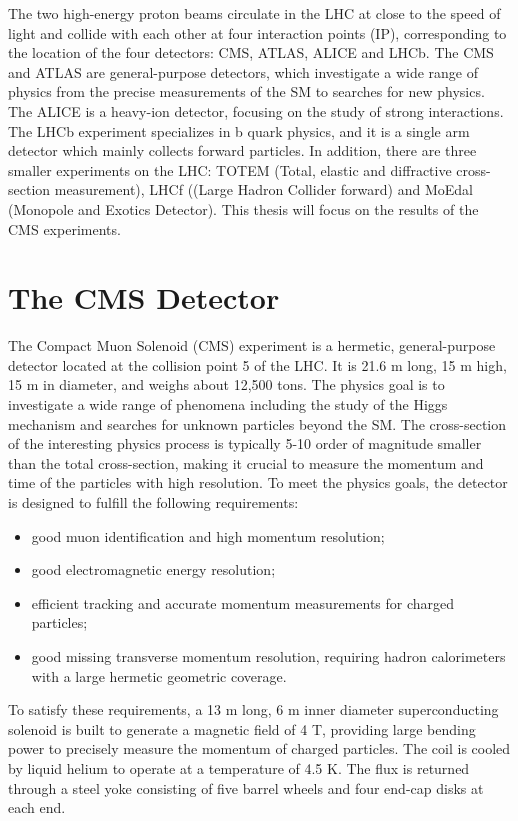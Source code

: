 \documentclass[thesis.tex]{subfiles}
\begin{document}
The two high-energy proton beams circulate in the LHC at close to the speed of light and collide with each other at four interaction points (IP), corresponding to the location of the four detectors: CMS, ATLAS, ALICE and LHCb. 
The CMS and ATLAS are general-purpose detectors, which investigate a wide range of physics from the precise measurements of the SM to searches for new physics. 
The ALICE is a heavy-ion detector, focusing on the study of strong interactions. 
The LHCb experiment specializes in b quark physics, and it is a single arm detector which mainly collects forward particles. 
In addition, there are three smaller experiments on the LHC: TOTEM (Total, elastic and diffractive cross-section measurement), LHCf ((Large Hadron Collider forward) and MoEdal (Monopole and Exotics Detector). 
This thesis will focus on the results of the CMS experiments. 

\section{The CMS Detector}

The Compact Muon Solenoid (CMS) experiment is a hermetic, general-purpose detector located at the collision point 5 of the LHC.  It is 21.6 m long, 15 m high, 15 m in diameter, and weighs about 12,500 tons. The physics goal is to investigate a wide range of phenomena including the study of the Higgs mechanism and searches for unknown particles beyond the SM. The cross-section of the interesting physics process is typically 5-10 order of magnitude smaller than the total cross-section, making it crucial to measure the momentum and time of the particles with high resolution. To meet the physics goals, the detector is designed to fulfill the following requirements:   
\begin{itemize}
\item good muon identification and high momentum resolution;
\item good electromagnetic energy resolution;
\item efficient tracking and accurate momentum measurements for charged particles;
\item good missing transverse momentum resolution, requiring hadron calorimeters with a large hermetic geometric coverage. 
\end{itemize}

To satisfy these requirements, a 13 m long, 6 m inner diameter superconducting solenoid is built to generate a magnetic field of 4 T, providing large bending power to precisely measure the momentum of charged particles. The coil is cooled by liquid helium to operate at a temperature of 4.5 K. The flux is returned through a steel yoke consisting of five barrel wheels and four end-cap disks at each end. 
\end{document}
